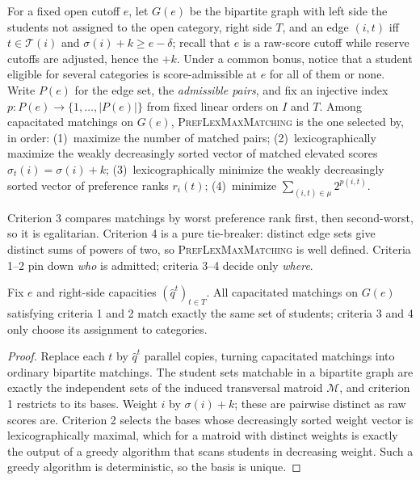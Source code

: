\documentclass[runningheads]{llncs}
\newcommand{\T}{\mathcal{T}}
\begin{document}
For a fixed open cutoff $e$, let $G(e)$ be the bipartite graph with left side the students not assigned to the open category, right side $T$, and an edge $(i,t)$ iff $t\in\T(i)$ and $\sigma(i)+k\ge e-\delta$; recall that $e$ is a raw-score cutoff while reserve cutoffs are adjusted, hence the $+k$. Under a common bonus, notice that a student eligible for several categories is score-admissible at $e$ for all of them or none. Write $P(e)$ for the edge set, the \emph{admissible pairs}, and fix an injective index $p:P(e)\to\{1,\dots,|P(e)|\}$ from fixed linear orders on $I$ and $T$. Among capacitated matchings on $G(e)$, \textsc{PrefLexMaxMatching} is the one selected by, in order: (1)~maximize the number of matched pairs; (2)~lexicographically maximize the weakly decreasingly sorted vector of matched elevated scores $\sigma_t(i)=\sigma(i)+k$; (3)~lexicographically minimize the weakly decreasingly sorted vector of preference ranks $r_i(t)$; (4)~minimize $\sum_{(i,t)\in\mu}2^{p(i,t)}$.

Criterion 3 compares matchings by worst preference rank first, then second-worst, so it is egalitarian. Criterion 4 is a pure tie-breaker: distinct edge sets give distinct sums of powers of two, so \textsc{PrefLexMaxMatching} is well defined. Criteria 1--2 pin down \emph{who} is admitted; criteria 3--4 decide only \emph{where}.

\begin{lemma}
\label{lem:matroid}
Fix $e$ and right-side capacities $(\hat q^t)_{t\in T}$. All capacitated matchings on $G(e)$ satisfying criteria 1 and 2 match exactly the same set of students; criteria 3 and 4 only choose its assignment to categories.
\end{lemma}

\begin{proof}
Replace each $t$ by $\hat q^t$ parallel copies, turning capacitated matchings into ordinary bipartite matchings. The student sets matchable in a bipartite graph are exactly the independent sets of the induced transversal matroid $\mathcal{M}$, and criterion 1 restricts to its bases. Weight $i$ by $\sigma(i)+k$; these are pairwise distinct as raw scores are. Criterion 2 selects the bases whose decreasingly sorted weight vector is lexicographically maximal, which for a matroid with distinct weights is exactly the output of a greedy algorithm that scans students in decreasing weight. Such a greedy algorithm is deterministic, so the basis is unique.
\end{proof}
\end{document}
